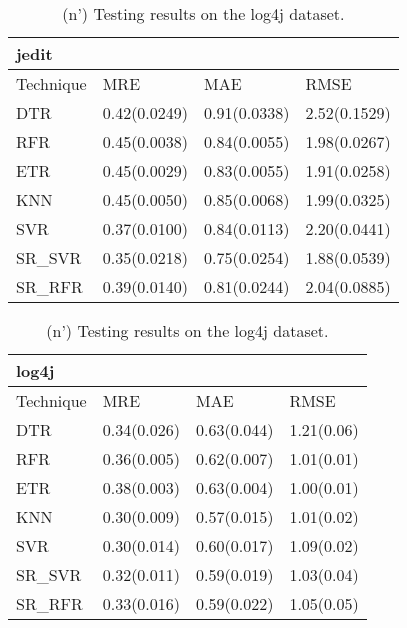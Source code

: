 \documentclass[]{article}
\begin{document}
\begin{table}[h]
	\captionsetup[subtable]{labelformat=empty}
	\begin{adjustwidth}{-3.4cm}{}
		\begin{subtable}{9.5cm}
			\centering
			\caption{(m') Testing results on the jedit dataset.}
			\label{tab:xalan-wv}
			\begin{tabular}{llll}
				\hline
				jedit &              &              &              \\ \hline
				Technique & MRE          & MAE          & RMSE         \\ \hline
				DTR       & 0.42(0.0249) & 0.91(0.0338) & 2.52(0.1529) \\
				RFR       & 0.45(0.0038) & 0.84(0.0055) & 1.98(0.0267) \\
				ETR       & 0.45(0.0029) & 0.83(0.0055) & 1.91(0.0258) \\
				KNN       & 0.45(0.0050) & 0.85(0.0068) & 1.99(0.0325) \\
				SVR       & 0.37(0.0100) & 0.84(0.0113) & 2.20(0.0441) \\
				SR\_SVR    & 0.35(0.0218) & 0.75(0.0254) & 1.88(0.0539) \\
				SR\_RFR    & 0.39(0.0140) & 0.81(0.0244) & 2.04(0.0885) \\ \hline
			\end{tabular}
		\end{subtable}
		\begin{subtable}{9.5cm}
			\centering
			\caption{(n') Testing results on the log4j dataset.}
			\label{tab:xerces-wv}
			\begin{tabular}{llll}
				\hline
				log4j &             &             &            \\ \hline
				Technique & MRE         & MAE         & RMSE       \\ \hline
				DTR       & 0.34(0.026) & 0.63(0.044) & 1.21(0.06) \\
				RFR       & 0.36(0.005) & 0.62(0.007) & 1.01(0.01) \\
				ETR       & 0.38(0.003) & 0.63(0.004) & 1.00(0.01) \\
				KNN       & 0.30(0.009) & 0.57(0.015) & 1.01(0.02) \\
				SVR       & 0.30(0.014) & 0.60(0.017) & 1.09(0.02) \\
				SR\_SVR    & 0.32(0.011) & 0.59(0.019) & 1.03(0.04) \\
				SR\_RFR    & 0.33(0.016) & 0.59(0.022) & 1.05(0.05) \\ \hline
			\end{tabular}
		\end{subtable} 
	\end{adjustwidth}
\end{table}
\end{document}
